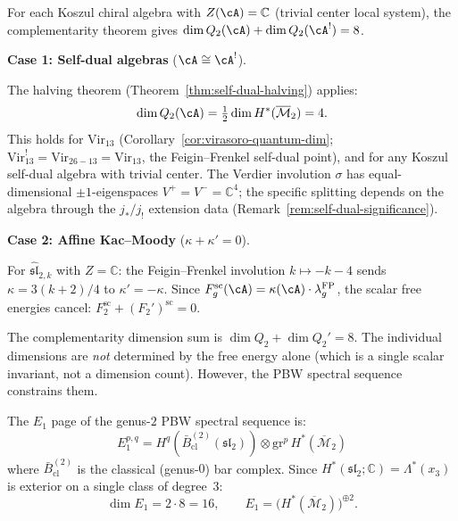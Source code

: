 \begin{computation}%

\label{comp:genus2-complementarity-table}
For each Koszul chiral algebra with $Z(\cA) = \mathbb{C}$
(trivial center local system), the complementarity
theorem gives $\dim Q_2(\cA) + \dim Q_2(\cA^!) = 8$.

\smallskip
\noindent\textbf{Case 1: Self-dual algebras} ($\cA \cong \cA^!$).

The halving theorem (Theorem~\ref{thm:self-dual-halving}) applies:
\begin{equation}\label{eq:genus2-self-dual-dims}
\dim Q_2(\cA) = \tfrac{1}{2}\dim H^*(\overline{\mathcal{M}}_2) = 4.
\end{equation}
This holds for
$\mathrm{Vir}_{13}$ (Corollary~\ref{cor:virasoro-quantum-dim};
$\mathrm{Vir}_{13}^! = \mathrm{Vir}_{26-13} = \mathrm{Vir}_{13}$,
the Feigin--Frenkel self-dual point),
and for any Koszul self-dual algebra with trivial center.
The Verdier involution $\sigma$ has equal-dimensional $\pm 1$-eigenspaces
$V^+ = V^- = \mathbb{C}^4$; the specific splitting depends on the
algebra through the $j_*/j_!$ extension data
(Remark~\ref{rem:self-dual-significance}).

\smallskip
\noindent\textbf{Case 2: Affine Kac--Moody} ($\kappa + \kappa' = 0$).

For $\widehat{\mathfrak{sl}}_{2,k}$ with $Z = \mathbb{C}$:
the Feigin--Frenkel involution $k \mapsto -k-4$ sends
$\kappa = 3(k+2)/4$ to $\kappa' = -\kappa$. Since
$F_g^{\mathrm{sc}}(\cA) =
\kappa(\cA) \cdot \lambda_g^{\mathrm{FP}}$, the scalar free
energies cancel: $F_2^{\mathrm{sc}} + (F_2')^{\mathrm{sc}} = 0$.

The complementarity dimension sum is $\dim Q_2 + \dim Q_2' = 8$.
The individual dimensions are \emph{not} determined by the free
energy alone (which is a single scalar invariant, not a dimension
count). However, the PBW spectral sequence constrains them.

The $E_1$ page of the genus-$2$ PBW spectral sequence is:
\[
E_1^{p,q} = H^q(\bar{B}^{(2)}_{\mathrm{cl}}(\mathfrak{sl}_2))
\otimes \mathrm{gr}^p \, H^*(\overline{\mathcal{M}}_2)
\]
where $\bar{B}^{(2)}_{\mathrm{cl}}$ is the classical (genus-$0$) bar
complex. Since $H^*(\mathfrak{sl}_2;\mathbb{C}) =
\Lambda^*(x_3)$ is exterior on a single class of degree~$3$:
\[
\dim E_1 = 2 \cdot 8 = 16, \qquad
E_1 = \bigl(H^*(\overline{\mathcal{M}}_2)\bigr)^{\oplus 2}.
\]


\end{computation}

